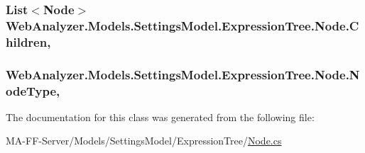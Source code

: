 \subsubsection[{Children}]{\setlength{\rightskip}{0pt plus 5cm}List$<${\bf Node}$>$ Web\+Analyzer.\+Models.\+Settings\+Model.\+Expression\+Tree.\+Node.\+Children\hspace{0.3cm}{\ttfamily [get]}, {\ttfamily [set]}}\label{class_web_analyzer_1_1_models_1_1_settings_model_1_1_expression_tree_1_1_node_af97835cf31c19c83f0044bbd6f4a9e91}
\hypertarget{class_web_analyzer_1_1_models_1_1_settings_model_1_1_expression_tree_1_1_node_a326bab10d73a525224fcf5b061491dda}{}
\subsubsection[{Node\+Type}]{ Web\+Analyzer.\+Models.\+Settings\+Model.\+Expression\+Tree.\+Node.\+Node\+Type\hspace{0.3cm}{\ttfamily [get]}, {\ttfamily [set]}}\label{class_web_analyzer_1_1_models_1_1_settings_model_1_1_expression_tree_1_1_node_a326bab10d73a525224fcf5b061491dda}


The documentation for this class was generated from the following file\+:\begin{DoxyCompactItemize}
\item 
M\+A-\/\+F\+F-\/\+Server/\+Models/\+Settings\+Model/\+Expression\+Tree/\hyperlink{_node_8cs}{Node.\+cs}\end{DoxyCompactItemize}
